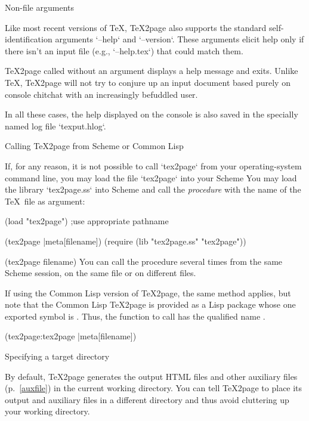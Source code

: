 \beginsection Non-file arguments

%
%
Like most recent versions of \TeX, \TeX2page also
supports the standard self-identification
arguments `--help` and `--version`.  These
arguments elicit help only if there isn’t an input file
(e.g., `--help.tex`) that could match them.

\TeX2page called without an argument displays a help
message and exits.  Unlike \TeX, \TeX2page will not try
to conjure up an input document based purely on console
chitchat with an increasingly befuddled user.

In all these cases, the help displayed on the console
is also saved in the specially named log file
`texput.hlog`.

\beginsection Calling \TeX2page from Scheme or Common Lisp

%
\ifx\inpltdist\Undefined
If, for any reason, it is not possible to call `tex2page`
from your operating-system command line, you may load the
file `tex2page` into your Scheme
\else
You may load the
library `tex2page.ss` into Scheme
\fi and call the
{\em procedure}  with the name of the \TeX\ file
as argument:

\ifx\inpltdist\Undefined
\begintts
(load "tex2page") ;use appropriate pathname

(tex2page |meta[filename])
\endtt
\else
\begintts
(require (lib "tex2page.ss" "tex2page"))

(tex2page filename)
\endtt
\fi
%
You can call the procedure
 several times from the same Scheme
session, on the same file or on different files.

If using the Common Lisp version of \TeX2page, the same method applies,
but note that the Common Lisp \TeX2page is provided as a Lisp package
 whose one exported symbol is .  Thus, the
function to call has the qualified name .

\begintts
(tex2page:tex2page |meta[filename])
\endtt

\beginsection Specifying a target directory

%
By default, \TeX2page generates the output HTML files
and other auxiliary files (p.~\ref{auxfile}) in the
current working directory.  You can tell \TeX2page
to place its output and auxiliary files in a different
directory and thus avoid cluttering up your working
directory.


